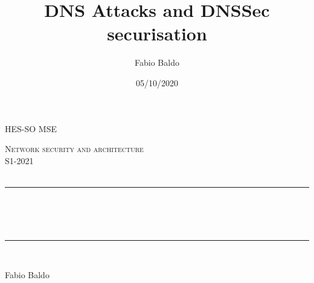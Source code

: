 
\title{DNS Attacks and DNSSec securisation}													%
\author{Fabio Baldo}														%
\date{05/10/2020}														%



\makeatletter
\let\thetitle\@title
\let\theauthor\@author
\let\thedate\@date
\makeatother
\pagestyle{fancy}
\fancyhf{}
\rhead{\theauthor}
\lhead{\thetitle}
\cfoot{\thepage}
\newcommand{\mis}[3]{(#1 \pm #2) \ #3}
\newcommand{\misp}[3]{(#1 \#3 \pm #2}



\begin{titlepage}
	
    \begin{center}				
    \textsc{\LARGE HES-SO MSE}\\[2.0 cm]						%
    
        \vspace*{2.00 cm}
    
	\textsc{\Large Network security and architecture}\\[0.30 cm]		%
	\textsc{\Large S1-2021 }\\[0.5 cm]		%
	\textsc{\Large  }\\[0.5 cm] %
	\rule{\linewidth}{0.2 mm} \\[0.4 cm]
	{ \huge \bfseries \thetitle \\ \small \thedate}\\
	\rule{\linewidth}{0.2 mm} \\[1.5 cm]
	
    	\begin{center}
    	    Fabio Baldo
    	\end{center}
    	
	\end{center}
\end{titlepage}
